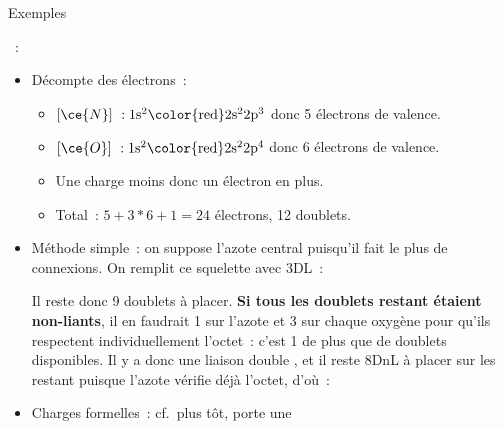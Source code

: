 \documentclass[../main/main.tex]{subfiles}
\begin{document}
\begin{rexem}{Exemples}
\begin{center}
    \end{center}
    \begin{enumerate}[resume]
        ~:
            \begin{itemize}[label=$\triangleright$, leftmargin=20pt]
                \item Décompte des électrons~:
                    \begin{itemize}[label=$\ra$, leftmargin=20pt]
                        \item $[\ce{N}]~: \rm 1s^2\color{red}2s^22p^3$
                            donc 5 électrons de valence.
                        \item $[\ce{O}]~: \rm 1s^2\color{red}2s^22p^4$
                            donc 6 électrons de valence.
                        \item Une charge moins donc un électron en plus.
                        \item Total~: $5 + 3*6 + 1 = 24$ électrons, 12
                            doublets.
                    \end{itemize}
                \item Méthode simple~: on suppose l'azote central puisqu'il
                    fait le plus de connexions. On remplit ce squelette avec
                    3DL~:
                    \begin{center}
                    \end{center}
                    Il reste donc 9 doublets à placer. \textbf{Si tous les
                    doublets restant étaient non-liants}, il en faudrait 1 sur
                    l'azote et 3 sur chaque oxygène pour qu'ils respectent
                    individuellement l'octet~: c'est 1 de plus que de doublets
                    disponibles. Il y a donc une liaison double , et il
                    reste 8DnL à placer sur les  restant puisque l'azote
                    vérifie déjà l'octet, d'où~:
                    \begin{center}
                    \end{center}
                \item Charges formelles~: cf.\ plus tôt,  porte une

\end{itemize}
\end{enumerate}
\end{rexem}
\end{document}

